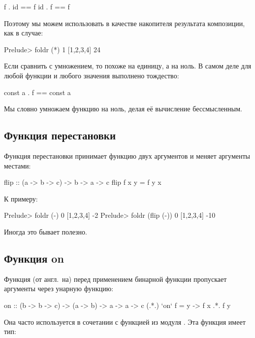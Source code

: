 \begin{code}
f  . id  ==  f
id . f   ==  f
\end{code}

Поэтому мы можем использовать  в качестве накопителя 
результата композиции, как в случае: 

\begin{code}
Prelude> foldr (*) 1 [1,2,3,4]
24
\end{code}

Если сравнить  с умножением, то  похоже
на единицу, а  на ноль. В самом деле для 
любой функции  и любого значения  выполнено
тождество:

\begin{code}
const a  .  f  == const a
\end{code}

Мы словно умножаем функцию на ноль, делая 
её вычисление бессмысленным. 

\subsection{Функция перестановки}

Функция перестановки  принимает функцию
двух аргументов и меняет аргументы местами:

\begin{code}
flip  :: (a -> b -> c) -> b -> a -> c
flip f x y = f y x
\end{code}

К примеру:

\begin{code}
Prelude> foldr (-) 0 [1,2,3,4]
-2
Prelude> foldr (flip (-)) 0 [1,2,3,4]
-10
\end{code}

Иногда это бывает полезно.

\subsection{Функция on}

Функция  (от англ.~на) перед применением бинарной
функции пропускает аргументы через унарную функцию:

\begin{code}
on :: (b -> b -> c) -> (a -> b) -> a -> a -> c
(.*.) `on` f = \x y -> f x .*. f y
\end{code}

Она часто используется в сочетании с функцией 
из модуля . Эта функция имеет тип:

